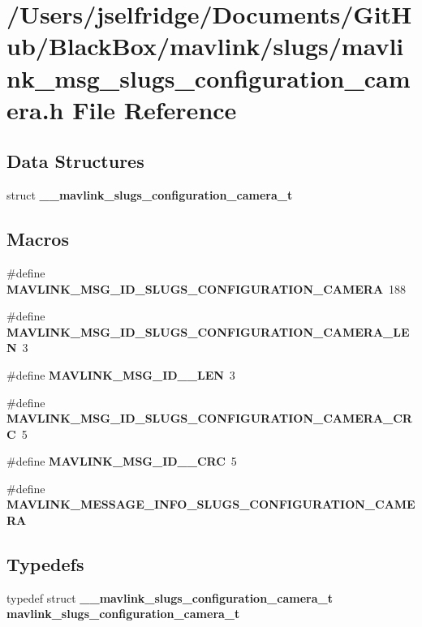 \section{/\+Users/jselfridge/\+Documents/\+Git\+Hub/\+Black\+Box/mavlink/slugs/mavlink\+\_\+msg\+\_\+slugs\+\_\+configuration\+\_\+camera.h File Reference}
\label{mavlink__msg__slugs__configuration__camera_8h}
\subsection*{Data Structures}
\begin{DoxyCompactItemize}
\item 
struct \textbf{ \+\_\+\+\_\+mavlink\+\_\+slugs\+\_\+configuration\+\_\+camera\+\_\+t}
\end{DoxyCompactItemize}
\subsection*{Macros}
\begin{DoxyCompactItemize}
\item 
\#define \textbf{ M\+A\+V\+L\+I\+N\+K\+\_\+\+M\+S\+G\+\_\+\+I\+D\+\_\+\+S\+L\+U\+G\+S\+\_\+\+C\+O\+N\+F\+I\+G\+U\+R\+A\+T\+I\+O\+N\+\_\+\+C\+A\+M\+E\+RA}~188
\item 
\#define \textbf{ M\+A\+V\+L\+I\+N\+K\+\_\+\+M\+S\+G\+\_\+\+I\+D\+\_\+\+S\+L\+U\+G\+S\+\_\+\+C\+O\+N\+F\+I\+G\+U\+R\+A\+T\+I\+O\+N\+\_\+\+C\+A\+M\+E\+R\+A\+\_\+\+L\+EN}~3
\item 
\#define \textbf{ M\+A\+V\+L\+I\+N\+K\+\_\+\+M\+S\+G\+\_\+\+I\+D\+\_\+\_\+\+L\+EN}~3
\item 
\#define \textbf{ M\+A\+V\+L\+I\+N\+K\+\_\+\+M\+S\+G\+\_\+\+I\+D\+\_\+\+S\+L\+U\+G\+S\+\_\+\+C\+O\+N\+F\+I\+G\+U\+R\+A\+T\+I\+O\+N\+\_\+\+C\+A\+M\+E\+R\+A\+\_\+\+C\+RC}~5
\item 
\#define \textbf{ M\+A\+V\+L\+I\+N\+K\+\_\+\+M\+S\+G\+\_\+\+I\+D\+\_\+\_\+\+C\+RC}~5
\item 
\#define \textbf{ M\+A\+V\+L\+I\+N\+K\+\_\+\+M\+E\+S\+S\+A\+G\+E\+\_\+\+I\+N\+F\+O\+\_\+\+S\+L\+U\+G\+S\+\_\+\+C\+O\+N\+F\+I\+G\+U\+R\+A\+T\+I\+O\+N\+\_\+\+C\+A\+M\+E\+RA}
\end{DoxyCompactItemize}
\subsection*{Typedefs}
\begin{DoxyCompactItemize}
\item 
typedef struct \textbf{ \+\_\+\+\_\+mavlink\+\_\+slugs\+\_\+configuration\+\_\+camera\+\_\+t} \textbf{ mavlink\+\_\+slugs\+\_\+configuration\+\_\+camera\+\_\+t}
\end{DoxyCompactItemize}


